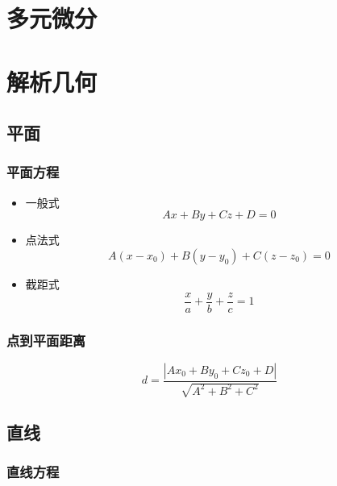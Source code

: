 \documentclass{ctexart}
\begin{document}
\section{多元微分}

\section{解析几何}

\subsection{平面}

\subsubsection{平面方程}

\begin{itemize}
    \item 一般式 \begin{equation}
              A x + B y + C z + D = 0
          \end{equation}
    \item 点法式 \begin{equation}
              A (x - x_0) + B (y - y_0) + C (z - z_0) = 0
          \end{equation}
    \item 截距式 \begin{equation}
              \frac{x}{a} + \frac{y}{b} + \frac{z}{c} = 1
          \end{equation}
\end{itemize}

\subsubsection{点到平面距离}

\begin{equation}
    d = \frac{|A x_0 + B y_0 + C z_0 + D|}{\sqrt{A^2 + B^2 + C^2}}
\end{equation}

\subsection{直线}

\subsubsection{直线方程}
\end{document}
